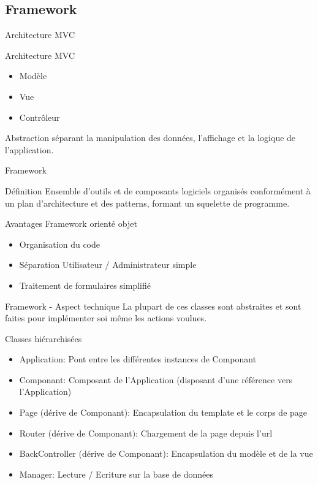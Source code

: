 \subsection{Framework}
\begin{frame}{Architecture MVC}
    \begin{block}{Architecture MVC}
    \begin{itemize}
    \item Modèle
    \item Vue
    \item Contrôleur
    \end{itemize}
    Abstraction séparant la manipulation des données, l'affichage et la logique de l'application.
    \end{block}
\end{frame}

\begin{frame}{Framework}
    \begin{block}{Définition}
    Ensemble d'outils et de composants logiciels organisés conformément à un plan d'architecture et des patterns, formant un squelette de programme.
    \end{block}

    \begin{block}{Avantages}
    Framework orienté objet
    \begin{itemize}
    \item Organisation du code
    \item Séparation Utilisateur / Administrateur simple
    \item Traitement de formulaires simplifié
    \end{itemize}
    \end{block}
\end{frame}

\begin{frame}{Framework - Aspect technique}
    La plupart de ces classes sont abstraites et sont faites pour implémenter soi même les actions voulues.
    \begin{block}{Classes hiérarchisées}
    \begin{itemize}
    \item Application: Pont entre les différentes instances de Componant
    \item Componant: Composant de l'Application (disposant d'une référence vers l'Application)
    \item Page (dérive de Componant): Encapsulation du template et le corps de page
    \item Router (dérive de Componant): Chargement de la page depuis l'url
    \item BackController (dérive de Componant): Encapsulation du modèle et de la vue
    \item Manager: Lecture / Ecriture sur la base de données
    \end{itemize}
    \end{block}
\end{frame}

